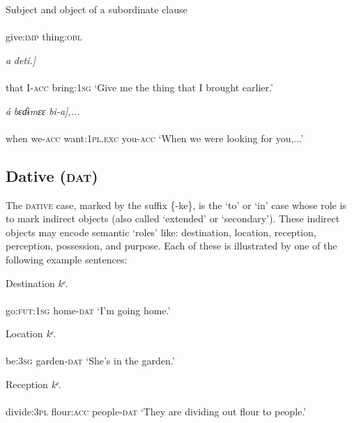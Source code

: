 Subject and object of a subordinate clause
\ea\label{ex:}
    \\
    \\
give:\textsc{imp}   thing:\textsc{obl}   
\z

\ea\label{ex:}
\gll {[náa   ɲci-}\textit{a}\textit{   detí.]} \\
    \\
that\textsc{}  I-\textsc{acc}   bring:\textsc{1sg}
\glt ‘Give me the thing that I brought earlier.’ 
\z




\ea\label{ex:}
\gll {[Noo   ŋgó-}\textit{á}\textit{     bɛɗɨmɛɛ     bi-}\textit{a}\textit{],...} \\
    \\
when   we-\textsc{acc}   want:\textsc{1pl.exc}   you-\textsc{acc}
\glt ‘When we were looking for you,...’ 
\z






\subsection{Dative (\textsc{dat})}


The \textsc{dative} case, marked by the suffix \{-ke\}, is the ‘to’ or ‘in’ case whose role is to mark indirect objects (also called ‘extended’ or ‘secondary’). These indirect objects may encode semantic ‘roles’ like: destination, location, reception, perception, possession, and purpose. Each of these is illustrated by one of the following example sentences:




Destination
\ea\label{ex:}
\textit{kᵉ}. \\
    \\
go:\textsc{fut:1sg}   home-\textsc{dat}
\glt ‘I’m going home.’ 
\z




Location
\ea\label{ex:}
\textit{kᵉ}. \\
    \\
be:\textsc{3sg}   garden-\textsc{dat}
\glt ‘She’s in the garden.’ 
\z


Reception
\ea\label{ex:}
\textit{kᵉ}. \\
    \\
divide:\textsc{3pl}   flour:\textsc{acc}   people-\textsc{dat}
\glt ‘They are dividing out flour to people.’ 
\z




